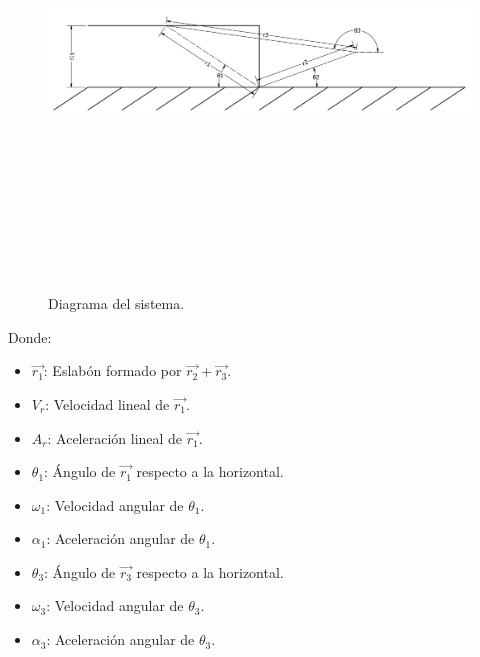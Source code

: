 \documentclass[12pt]{article}
\begin{document}
\begin{figure} [H]
        \centerline{\includegraphics[width=14cm, height=12cm,keepaspectratio]{cadena cinematica.jpg}}
        \caption{Diagrama del sistema.}
        \label{cadena cinematica}
    \end{figure}
            \vspace{-15pt}
Donde:
    \begin{multicols}{3}
    \begin{itemize}
        \item $\vec{r_1}$: Eslabón formado por $\vec{r_2}+\vec{r_3}$.
        \item $V_r$: Velocidad lineal de $\vec{r_1}$.
        \item $A_r$: Aceleración lineal de $\vec{r_1}$.
        \item $\theta_1$: Ángulo de $\vec{r_1}$ respecto a la horizontal.
        \item $\omega_1$: Velocidad angular de $\theta_1$.
        \item $\alpha_1$: Aceleración angular de $\theta_1$.
        \item $\theta_3$: Ángulo de $\vec{r_3}$ respecto a la horizontal.
        \item $\omega_3$: Velocidad angular de $\theta_3$.
        \item $\alpha_3$: Aceleración angular de $\theta_3$.
    \end{itemize}
    \end{multicols}
\end{document}
